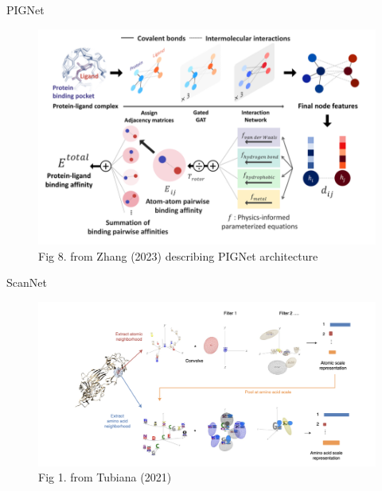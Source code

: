 \documentclass{beamer}
\begin{document}
\begin{frame}{PIGNet}
    \begin{figure}
        \centering 
        \includegraphics[scale=0.6]{Zhang_Fig8_Binding.png}
        \caption{Fig 8. from Zhang (2023) describing PIGNet architecture \cite{moon_pignet_2022, zhang_systematic_2023}}
    \end{figure}
\end{frame}


\begin{frame}{ScanNet}
    \begin{figure}
        \centering 
        \includegraphics[scale=0.35]{ScanNet_Pooling.png}
        \caption{Fig 1. from Tubiana (2021) \cite{tubiana_scannet_2022}}
    \end{figure}
\end{frame}
\end{document}
